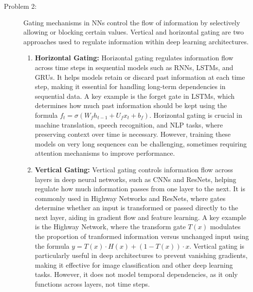 \documentclass[10pt]{article}
\begin{document}
\begin{description}
\pagebreak

\item[Problem 2:]  \hfill %

Gating mechanisms in NNs control the flow of information by selectively allowing or blocking certain values. 
Vertical and horizontal gating are two approaches used to regulate information within deep learning architectures.

\begin{enumerate}
    \item \textbf{Horizontal Gating:} Horizontal gating regulates information flow across time steps in sequential models such as RNNs,
    LSTMs, and GRUs. It helps models retain or discard past information at each time step, making it essential for handling long-term dependencies in sequential data.
    A key example is the forget gate in LSTMs, which determines how much past information should be kept using the formula $f_t = \sigma(W_f h_{t-1} + U_f x_t + b_f)$.
    Horizontal gating is crucial in machine translation, speech recognition, and NLP tasks, where preserving context over time is necessary. 
    However, training these models on very long sequences can be challenging, sometimes requiring attention mechanisms to improve performance.

    \item \textbf{Vertical Gating:} Vertical gating controls information flow across layers in deep neural networks, such as CNNs and ResNets, 
    helping regulate how much information passes from one layer to the next. 
    It is commonly used in Highway Networks and ResNets, where gates determine whether an input is transformed or passed directly to the next layer,
    aiding in gradient flow and feature learning. A key example is the Highway Network, where the transform gate $T(x)$ modulates the proportion of tranformed information
    versus unchanged input using the formula $y = T(x) \cdot H(x) + (1 - T(x)) \cdot x$. Vertical gating is particularly useful in deep architectures to prevent vanishing 
    gradients, making it effective for image classification and other deep learning tasks. However, it does not model temporal dependencies, as it only functions across 
    layers, not time steps.
    
\end{enumerate}





\pagebreak


\end{description}
\end{document}
